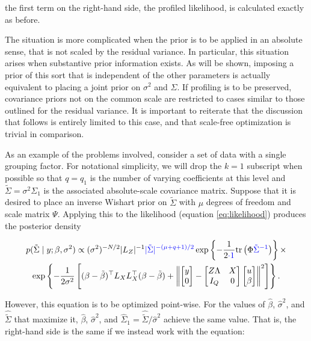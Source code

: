 \documentclass[article,shortnames]{jss}
\begin{document}
\noindent the first term on the right-hand side, the profiled
likelihood, is calculated exactly as before.

The situation is more complicated when the prior is
to be applied in an absolute sense, that is not scaled by the
residual variance. In particular, this situation arises when substantive prior
information exists. As will be shown, imposing a prior of
this sort that is independent of the other parameters is actually equivalent to placing a joint prior on
$\sigma^2$ and $\Sigma$. If profiling is to be preserved, 
covariance priors not on the common scale are restricted to cases similar
to those outlined for the residual variance. It is important to
reiterate that the discussion that follows is entirely limited to this
case, and that scale-free optimization is trivial in comparison.

As an example of the problems involved, consider a set of data with a single grouping
factor. For notational simplicity, we will drop the $k=1$ subscript
when possible so that $q=q_1$ is the number of varying coefficients at
this level and $\tilde\Sigma= \sigma^2 \Sigma_1$ is the associated
absolute-scale covariance matrix. Suppose that it is desired to place an inverse Wishart prior on
$\tilde\Sigma$ with $\mu$ degrees of freedom and scale matrix
$\Psi$. Applying this to the likelihood (equation \ref{eq:likelihood})
produces the posterior density

\begin{multline*}
  p(\tilde\Sigma \mid y; \beta, \sigma^2) \propto
  (\sigma^2)^{-N/2}|L_Z|^{-1} {\color{blue}|\tilde\Sigma|^{-(\mu + q + 1)/2}}
  \exp\left\{-\frac{1}{2{\color{blue}\cdot 1}} \mathrm{tr}\left(\Phi{\color{blue}\tilde\Sigma^{-1}}\right)\right\}\times \\
  \exp\left\{-\frac{1}{2\sigma^2} \left[(\beta - \tilde\beta)^\top
      L_XL_X^\top (\beta - \tilde\beta) + \left\|\begin{bmatrix} y \\
          0 \end{bmatrix} -
        \begin{bmatrix} Z\Lambda & X \\ I_Q & 0 \end{bmatrix}
        \begin{bmatrix} u \\ \beta \end{bmatrix}\right\|^2\right]\right\}.
\end{multline*}

However, this equation is to be optimized point-wise. For the values
of $\hat\beta$, $\hat\sigma^2$, and $\widehat{\tilde\Sigma}$ that
maximize it, $\hat\beta$, $\hat\sigma^2$, and $\hat\Sigma_1 =
\widehat{\tilde\Sigma} / \hat\sigma^2$ achieve
the same value. That is, the right-hand side is the same if we instead
work with the equation:
\end{document}
